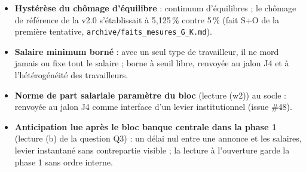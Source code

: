\documentclass[11pt,a4paper]{article}
\begin{document}
\begin{itemize}
\item \textbf{Hystérèse du chômage d'équilibre} : continuum d'équilibres ; le chômage de référence de la v2.0 s'établissait à 5,125\,\% contre 5\,\% (fait S+O de la première tentative, \nolinkurl{archive/faits_mesures_G_K.md}).
\item \textbf{Salaire minimum borné} : avec un seul type de travailleur, il ne mord jamais ou fixe tout le salaire ; borne à seuil libre, renvoyée au jalon J4 et à l'hétérogénéité des travailleurs.
\item \textbf{Norme de part salariale paramètre du bloc} (lecture (w2)) au socle : renvoyée au jalon J4 comme interface d'un levier institutionnel (issue \#48).
\item \textbf{Anticipation lue après le bloc banque centrale dans la phase 1} (lecture (b) de la question Q3) : un délai nul entre une annonce et les salaires, levier instantané sans contrepartie visible ; la lecture à l'ouverture garde la phase 1 sans ordre interne.
\end{itemize}
\end{document}

